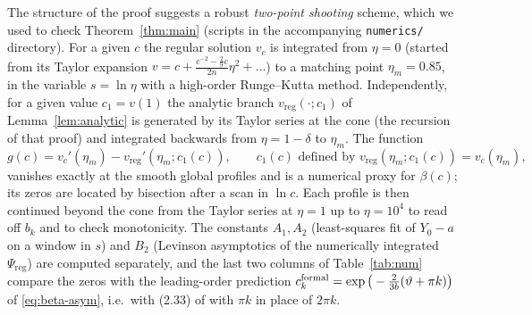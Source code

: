 \documentclass[11pt,a4paper]{amsart}
\theoremstyle{definition}
\theoremstyle{remark}
\newcommand{\vreg}{v_{\mathrm{reg}}}
\newcommand{\Preg}{\Psi_{\mathrm{reg}}}
\begin{document}
The structure of the proof suggests a robust \emph{two-point shooting} scheme, which we used to check Theorem~\ref{thm:main} (scripts in the accompanying \texttt{numerics/} directory).  For a given $c$ the regular solution $v_c$ is integrated from $\eta=0$ (started from its Taylor expansion $v=c+\frac{c^{-2}-\frac29c}{2n}\eta^2+\dots$) to a matching point $\eta_m=0.85$, in the variable $s=\ln\eta$ with a high-order Runge--Kutta method.  Independently, for a given value $c_1=v(1)$ the analytic branch $\vreg(\cdot;c_1)$ of Lemma~\ref{lem:analytic} is generated by its Taylor series at the cone (the recursion of that proof) and integrated backwards from $\eta=1-\delta$ to $\eta_m$.  The function
\[
g(c)=v_c'(\eta_m)-\vreg'(\eta_m;c_1(c)),\qquad c_1(c)\text{ defined by }\vreg(\eta_m;c_1(c))=v_c(\eta_m),
\]
vanishes exactly at the smooth global profiles and is a numerical proxy for $\beta(c)$; its zeros are located by bisection after a scan in $\ln c$.  Each profile is then continued beyond the cone from the Taylor series at $\eta=1$ up to $\eta=10^4$ to read off $b_k$ and to check monotonicity.  The constants $A_1,A_2$ (least-squares fit of $Y_0-a$ on a window in $s$) and $B_2$ (Levinson asymptotics of the numerically integrated $\Preg$) are computed separately, and the last two columns of Table~\ref{tab:num} compare the zeros with the leading-order prediction $c_k^{\rm formal}=\exp\big(-\frac{2}{3b}(\vartheta+\pi k)\big)$ of \eqref{eq:beta-asym}, i.e.\ with (2.33) of \cite{GHL22} with $\pi k$ in place of $2\pi k$.
\end{document}
